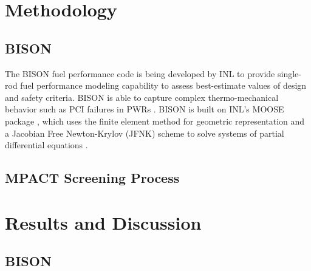 \documentclass[edeposit,fullpage,11pt]{uiucthesis2009}
\begin{document}
\chapter{Methodology}

\section{BISON}

The BISON fuel performance code is being developed by \gls{INL} to provide single-rod fuel performance modeling capability to assess best-estimate values of design and safety criteria. 
BISON is able to capture complex thermo-mechanical behavior such as PCI failures in PWRs \cite{montgomery_advanced_2014}. 
BISON is built on \gls{INL}'s \gls{MOOSE} package \cite{gaston_moose:_2009}, which uses the finite element method for geometric representation and a Jacobian Free Newton-Krylov (JFNK) scheme to solve systems of partial differential equations \cite{williamson_multidimensional_2012}. 
\section{MPACT Screening Process}

\chapter{Results and Discussion}

\section{BISON}
\end{document}
